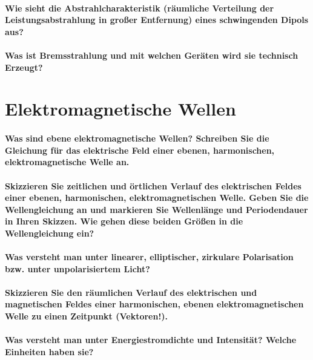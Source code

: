 \documentclass[a4paper, 11pt, parskip=half]{scrartcl}
\begin{document}
\paragraph{Wie sieht die Abstrahlcharakteristik (räumliche Verteilung der Leistungsabstrahlung in
großer Entfernung) eines schwingenden Dipols aus?}

\paragraph{Was ist Bremsstrahlung und mit welchen Geräten wird sie technisch Erzeugt?}

\newpage

\section{Elektromagnetische Wellen}

\paragraph{Was sind ebene elektromagnetische Wellen? Schreiben Sie die Gleichung für das elektrische
Feld einer ebenen, harmonischen, elektromagnetische Welle an.}

\paragraph{Skizzieren Sie zeitlichen und örtlichen Verlauf des elektrischen Feldes einer ebenen,
harmonischen, elektromagnetischen Welle. Geben Sie die Wellengleichung an und markieren Sie
Wellenlänge und Periodendauer in Ihren Skizzen. Wie gehen diese beiden Größen in die Wellengleichung
ein?}

\paragraph{Was versteht man unter linearer, elliptischer, zirkulare Polarisation bzw. unter
unpolarisiertem Licht?}

\paragraph{Skizzieren Sie den räumlichen Verlauf des elektrischen und magnetischen Feldes einer
harmonischen, ebenen elektromagnetischen Welle zu einen Zeitpunkt (Vektoren!).}

\paragraph{Was versteht man unter Energiestromdichte und Intensität? Welche Einheiten haben sie?}
\end{document}
